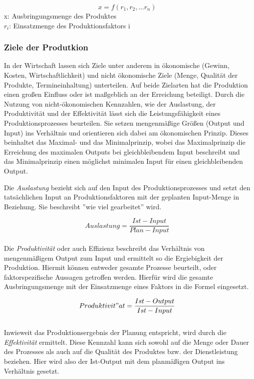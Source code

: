 \documentclass[a4paper,12pt, german]{report}
\begin{document}
\begin{equation}
  x = f(r_1,r_2,...r_n) 
\end{equation}
x: Ausbringungsmenge des Produktes \\
$r_{i}$: Einsatzmenge des Produktionsfaktors i \\

\subsubsection{Ziele der Produtkion}

In der Wirtschaft lassen sich Ziele unter anderem in ökonomische (Gewinn, Kosten, Wirtschaftlichkeit) und nicht ökonomische Ziele (Menge, Qualität der Produkte, Termineinhaltung) unterteilen. Auf beide Zielarten hat die Produktion einen großen Einfluss oder ist maßgeblich an der Erreichung beteiligt.\newline
Durch die Nutzung von nicht-ökonomischen Kennzahlen, wie der Auslastung, der Produktivität und der Effektivität lässt sich die Leistungsfähigkeit eines Produktionsprozesses beurteilen. Sie setzen mengenmäßige Größen (Output und Input) ins Verhältnis und orientieren sich dabei am ökonomischen Prinzip. Dieses beinhaltet das Maximal- und das Minimalprinzip, wobei das Maximalprinzip die Erreichung des maximalen Outputs bei gleichbleibendem Input beschreibt und das Minimalprinzip einen möglichst minimalen Input für einen gleichbleibenden Output.\cite{20}

Die \textit{Auslastung} bezieht sich auf den Input des Produktionsprozesses und setzt den tatsächlichen Input an Produktionsfaktoren mit der geplanten Input-Menge in Beziehung. Sie beschreibt ''wie viel gearbeitet'' wird.\cite{20}

\begin{equation}
  Auslastung =\frac{Ist-Input}{Plan-Input}
\end{equation}
$ $\\
Die \textit{Produktivität} oder auch Effizienz beschreibt das Verhältnis von mengenmäßigem Output zum Input und ermittelt so die Ergiebigkeit der Produktion. Hiermit können entweder gesamte Prozesse beurteilt, oder faktorspezifische Aussagen getroffen werden. Hierfür wird die gesamte Ausbringungsmenge mit der Einsatzmenge eines Faktors in die Formel eingesetzt.\cite{20}

\begin{equation}
  Produktivit"at =\frac{Ist-Output}{Ist-Input}
\end{equation}
$ $\\
Inwieweit das Produktionsergebnis der Planung entspricht, wird durch die \textit{Effektivität} ermittelt. Diese Kennzahl kann sich sowohl auf die Menge oder Dauer des Prozesses als auch auf die Qualität des Produktes bzw. der Dienstleistung beziehen. Hier wird also der Ist-Output mit dem planmäßigen Output ins Verhältnis gesetzt.\cite{20}
\end{document}
